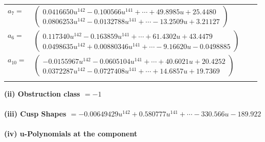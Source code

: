 \documentclass[1p]{elsarticle_modified}
\theoremstyle{definition}
\begin{document}
\begin{tabular}{m{7pt} m{180pt} m{7pt} m{180pt} }
\flushright $a_{7}=$&$\begin{pmatrix}0.0416650 u^{142}-0.100566 u^{141}+\cdots+49.8985 u+25.4480\\0.0806253 u^{142}-0.0132788 u^{141}+\cdots-13.2509 u+3.21127\end{pmatrix}$ \\
\flushright $a_{6}=$&$\begin{pmatrix}0.117340 u^{142}-0.163859 u^{141}+\cdots+61.4302 u+43.4479\\0.0498635 u^{142}+0.00880346 u^{141}+\cdots-9.16620 u-0.0498885\end{pmatrix}$ \\
\flushright $a_{10}=$&$\begin{pmatrix}-0.0155967 u^{142}-0.0605104 u^{141}+\cdots+40.6021 u+20.4252\\0.0372287 u^{142}-0.0727408 u^{141}+\cdots+14.6857 u+19.7369\end{pmatrix}$\\&\end{tabular}
\flushleft \textbf{(ii) Obstruction class $= -1$}\\~\\
\flushleft \textbf{(iii) Cusp Shapes $= -0.00649429 u^{142}+0.580777 u^{141}+\cdots-330.566 u-189.922$}\\~\\
\newpage\renewcommand{\arraystretch}{1}
\flushleft \textbf{(iv) u-Polynomials at the component}\newline \\
\end{document}
